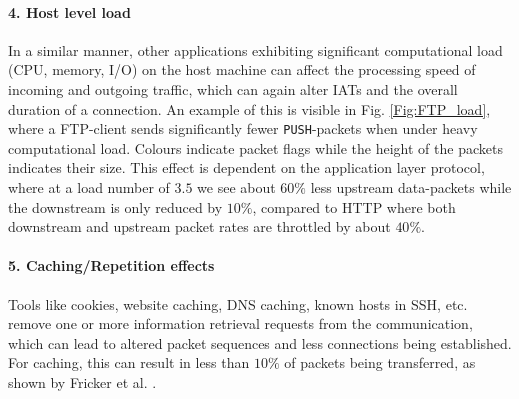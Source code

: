 \documentclass[runningheads]{llncs}
\begin{document}
\paragraph{4. Host level load}
In a similar manner, other applications exhibiting significant computational load (CPU, memory, I/O) on the host machine can affect the processing speed of incoming and outgoing traffic, which can again alter IATs and the overall duration of a connection. An example of this is visible in Fig. \ref{Fig:FTP_load}, where a FTP-client sends significantly fewer \texttt{PUSH}-packets when under heavy computational load. Colours indicate packet flags while the height of the packets indicates their size. This effect is dependent on the application layer protocol, where at a load number of $3.5$ we see about $60\%$ less upstream data-packets while the downstream is only reduced by $10\%$, compared to HTTP where both downstream and upstream packet rates are throttled by about $40\%$.





\paragraph{5. Caching/Repetition effects}
Tools like cookies, website caching, DNS caching, known hosts in SSH, etc. remove one or more information retrieval requests from the communication, which can lead to altered packet sequences and less connections being established. For caching, this can result in less than $10\%$ of packets being transferred, as shown by Fricker et al. \cite{fricker2012impact}. 


\end{document}
